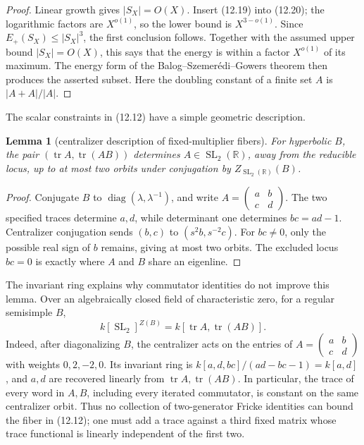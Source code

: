 \documentclass[11pt,reqno]{amsart}
\newtheorem{lemma}[theorem]{Lemma}
\theoremstyle{definition}
\theoremstyle{remark}
\newcommand{\R}{\mathbb R}
\newcommand{\Tr}{\operatorname{tr}}
\newcommand{\SL}{\operatorname{SL}}
\newcommand{\diag}{\operatorname{diag}}
\begin{document}
\begin{proof}
Linear growth gives \(|S_X|=O(X)\).  Insert (12.19) into (12.20); the
logarithmic factors are \(X^{o(1)}\), so the lower bound is
\(X^{3-o(1)}\).  Since
\(E_+(S_X)\le|S_X|^3\), the first conclusion follows.  Together with the
assumed upper bound \(|S_X|=O(X)\), this says that the energy is within a
factor \(X^{o(1)}\) of its maximum.  The energy form of the
Balog--Szemer\'edi--Gowers theorem then produces the asserted subset.  Here
the doubling constant of a finite set \(A\) is \(|A+A|/|A|\).
\end{proof}

The scalar constraints in (12.12) have a simple geometric description.

\begin{lemma}[centralizer description of fixed-multiplier fibers]
For hyperbolic \(B\), the pair
\((\Tr A,\Tr(AB))\) determines \(A\in\SL_2(\R)\), away from the reducible
locus, up to at most two orbits under conjugation by \(Z_{\SL_2(\R)}(B)\).
\end{lemma}

\begin{proof}
Conjugate \(B\) to \(\diag(\lambda,\lambda^{-1})\), and write
\(A=\left(\begin{smallmatrix}a&b\\c&d\end{smallmatrix}\right)\).  The two
specified traces determine \(a,d\), while determinant one determines
\(bc=ad-1\).  Centralizer conjugation sends
\((b,c)\) to \((s^2b,s^{-2}c)\).  For \(bc\ne0\), only the possible real sign
of \(b\) remains, giving at most two orbits.  The excluded locus \(bc=0\) is
exactly where \(A\) and \(B\) share an eigenline.
\end{proof}

The invariant ring explains why commutator identities do not improve this
lemma.  Over an algebraically closed field of characteristic zero, for a
regular semisimple \(B\),
\[
 k[\SL_2]^{Z(B)}=k[\Tr A,\Tr(AB)].
\]
Indeed, after diagonalizing \(B\), the centralizer acts on the entries of
\(A=(\begin{smallmatrix}a&b\\c&d\end{smallmatrix})\) with weights
\(0,2,-2,0\).  Its invariant ring is
\(k[a,d,bc]/(ad-bc-1)=k[a,d]\), and \(a,d\) are recovered linearly from
\(\Tr A,\Tr(AB)\).  In particular, the trace of every word in \(A,B\),
including every iterated commutator, is constant on the same
centralizer orbit.  Thus no collection of two-generator Fricke identities
can bound the fiber in (12.12); one must add a trace against a third fixed
matrix whose trace functional is linearly independent of the first two.
\end{document}
